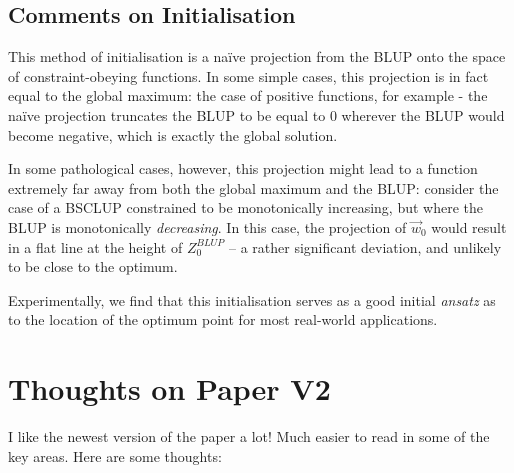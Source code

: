 \documentclass[]{article}
\begin{document}
		\subsection{Comments on Initialisation}

			This method of initialisation is a na\"ive projection from the BLUP onto the space of constraint-obeying functions. In some simple cases, this projection is in fact equal to the global maximum: the case of positive functions, for example - the na\"ive projection truncates the BLUP to be equal to 0 wherever the BLUP would become negative, which is exactly the global solution. 
			
			In some pathological cases, however, this projection might lead to a function extremely far away from both the global maximum and the BLUP: consider the case of a BSCLUP constrained to be monotonically increasing, but where the BLUP is monotonically \textit{decreasing}. In this case, the projection of $\vec{w}_0$ would result in a flat line at the height of $Z^{BLUP}_0$ -- a rather significant deviation, and unlikely to be close to the optimum.

			Experimentally, we find that this initialisation serves as a good initial \textit{ansatz} as to the location of the optimum point for most real-world applications.
			

	\section{Thoughts on Paper V2}
		I like the newest version of the paper a lot! Much easier to read in some of the key areas. Here are some thoughts:
\end{document}
